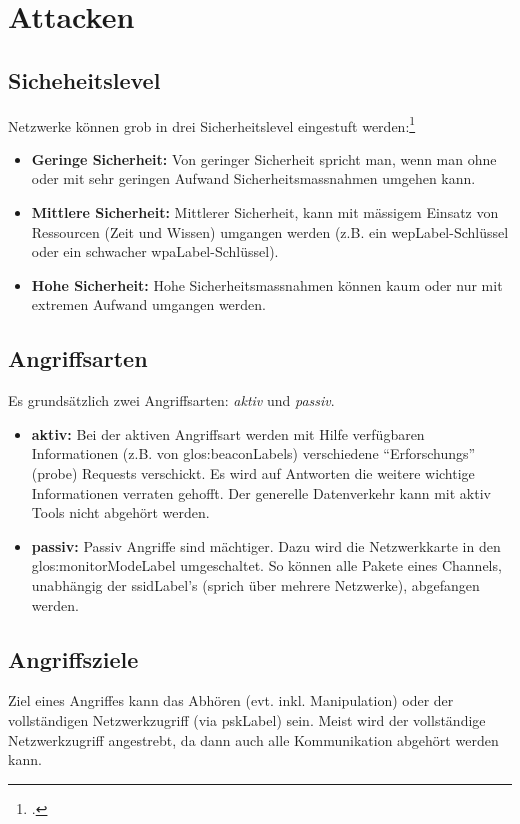 \section{Attacken}

\subsection{Sicheheitslevel}
Netzwerke können grob in drei Sicherheitslevel eingestuft werden:\footcite[][115]{WrightCache201503}
\begin{itemize}
	\item \textbf{Geringe Sicherheit:} Von geringer Sicherheit spricht man, wenn man ohne oder mit sehr geringen Aufwand Sicherheitsmassnahmen umgehen kann.
	\item \textbf{Mittlere Sicherheit:} Mittlerer Sicherheit, kann mit mässigem Einsatz von Ressourcen (Zeit und Wissen) umgangen werden (z.B. ein \gls{wepLabel}-Schlüssel oder ein schwacher \gls{wpaLabel}-Schlüssel).
	\item \textbf{Hohe Sicherheit:} Hohe Sicherheitsmassnahmen können kaum oder nur mit extremen Aufwand umgangen werden.
\end{itemize}

\subsection{Angriffsarten}
Es grundsätzlich zwei Angriffsarten: \textit{aktiv} und \textit{passiv}.
\begin{itemize}
	\item \textbf{aktiv:}
	Bei der aktiven Angriffsart werden mit Hilfe verfügbaren Informationen (z.B. von \glspl{glos:beaconLabel}) verschiedene "`Erforschungs"' (probe) Requests verschickt.
	Es wird auf Antworten die weitere wichtige Informationen verraten gehofft.
	Der generelle Datenverkehr kann mit aktiv Tools nicht abgehört werden.

	\item \textbf{passiv:}
	Passiv Angriffe sind mächtiger. Dazu wird die Netzwerkkarte in den \gls{glos:monitorModeLabel} umgeschaltet.
	So können alle Pakete eines Channels, unabhängig der \gls{ssidLabel}'s (sprich über mehrere Netzwerke), abgefangen werden.

\end{itemize}

\subsection{Angriffsziele}
Ziel eines Angriffes kann das Abhören (evt. inkl. Manipulation) oder der vollständigen Netzwerkzugriff (via \gls{pskLabel}) sein.
Meist wird der vollständige Netzwerkzugriff angestrebt, da dann auch alle Kommunikation abgehört werden kann.

